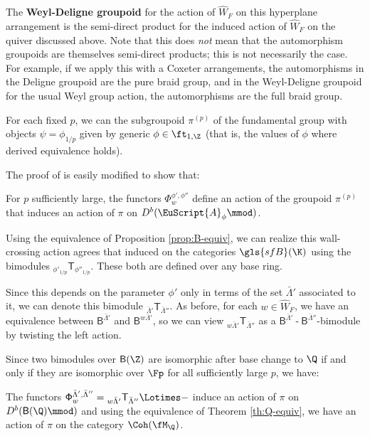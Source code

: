 The {\bf Weyl-Deligne groupoid} for the action of $\widehat{W}_F$ on this hyperplane arrangement is the semi-direct product for the induced action of $\widehat{W}_F$ on the quiver discussed above.  Note that this does {\it not} mean that the automorphism groupoids are themselves semi-direct products; this is not necessarily the case.  For example, if we apply this with a Coxeter arrangements, the automorphisms in the Deligne groupoid are the pure braid group, and in the Weyl-Deligne groupoid for the usual Weyl group action, the automorphisms are the full braid group.  

For each fixed $p$, we can the subgroupoid $\pi^{(p)}$ of the fundamental group with objects $\psi=\phi_{1/p}$ given by generic $\phi\in \ft_{1,\Z}$ (that is, the values of $\phi$ where derived equivalence holds).  

The proof of \cite[Thm. 6.35]{BLPWgco} is easily modified to show that:
\begin{proposition}
For $p$ sufficiently large,  the functors $\Phi_w^{\phi',\phi''}$  define an action of the groupoid $\pi^{(p)}$ that induces an action of $\pi$ on $D^b(\EuScript{A}_{\phi}\mmod)$.
\end{proposition}


Using the equivalence of Proposition \ref{prop:B-equiv}, we can realize this wall-crossing action agrees that induced on the categories $\gls{sfB}(\K)$ using the bimodules ${}_{\phi'_{1/p}}\mathsf{T}_{\phi''_{1/p}}$. These both are defined over any base ring.  

Since this  depends on the parameter $\phi'$ only in terms of the set $\bar{\Lambda}'$ associated to it, we can denote this bimodule ${}_{\bar{\Lambda}'}\mathsf{T}_{\bar{\Lambda}''}$. As before, for each $w\in \widehat{W}_F$, we have an equivalence between $\mathsf{B}^{\bar{\Lambda}'}$ and $\mathsf{B}^{w\bar{\Lambda}'}$, so we can view ${}_{w\bar{\Lambda}'}\mathsf{T}_{\bar{\Lambda}''}$ as a $\mathsf{B}^{\bar{\Lambda}'}\operatorname{-}\mathsf{B}^{\bar{\Lambda}''}$-bimodule by twisting the left action.

Since two bimodules over $\mathsf{B}(\Z)$ are isomorphic after base change to $\Q$ if and only if they are isomorphic over $\Fp$ for all sufficiently large $p$, we have:
\begin{corollary}\label{cor:coh-act}
The functors $\mathsf{\Phi}_w^{\bar{\Lambda}',\bar{\Lambda}''}={}_{w\bar{\Lambda}'}\mathsf{T}_{\bar{\Lambda}''}\Lotimes -$  induce an action of $\pi$ on $D^b(\mathsf{B}(\Q)\mmod)$ 
and using the equivalence of Theorem \ref{th:Q-equiv}, we have an action of $\pi$ on the category $\Coh(\fM_\Q)$. 
\end{corollary} 

